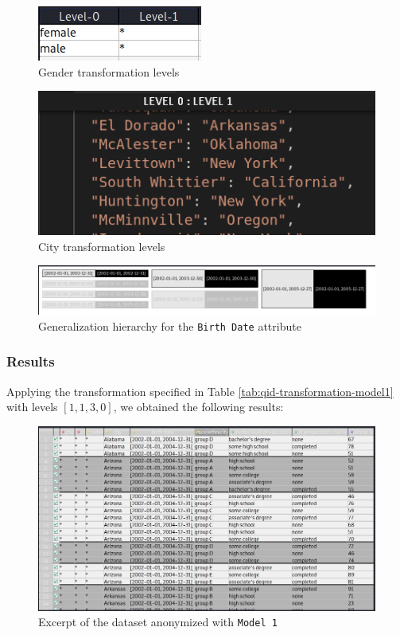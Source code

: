 \documentclass[a4paper, 11pt]{article}
\begin{document}
\begin{figure}[H]
	\centering
	
\includegraphics[width=.35\textwidth]{img/qids-trans/qid-model1-gender.png}
	\caption{Gender transformation levels}
	\label{fig:gender-model1}
\end{figure}

\begin{figure}[H]
	\centering
	
\includegraphics[width=.55\textwidth]{img/qids-trans/qid-model1-city.png}
	\caption{City transformation levels}
	\label{fig:city-model1}
\end{figure}

\begin{figure}[H]
	\centering
	\includegraphics[width=\textwidth]{img/qids-trans/qid-model1-birth.png}
	\caption{Generalization hierarchy for the \texttt{Birth Date} attribute}
	\label{fig:birth-model1}
\end{figure}


\subsubsection{Results}

Applying the transformation specified in Table 
\ref{tab:qid-transformation-model1} with levels $[1, 1, 3, 0]$, we obtained the 
following results:

\vspace{1.5\baselineskip}

\begin{figure}[H]
	\centering
	\includegraphics[width=\textwidth]{img/model1-output-data.png}
	\caption{Excerpt of the dataset anonymized with \texttt{Model 1}}
	\label{fig:model1-output}
\end{figure}
\end{document}
